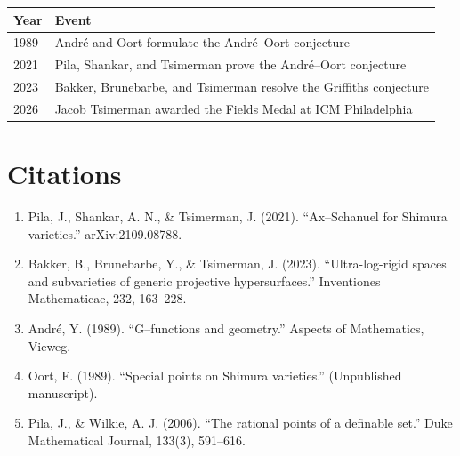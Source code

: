 \begin{tabularx}{\linewidth}{lX}
\toprule
\textbf{Year} & \textbf{Event} \\ \midrule
1989 & André and Oort formulate the André--Oort conjecture \\
2021 & Pila, Shankar, and Tsimerman prove the André--Oort conjecture \\
2023 & Bakker, Brunebarbe, and Tsimerman resolve the Griffiths conjecture \\
2026 & Jacob Tsimerman awarded the Fields Medal at ICM Philadelphia \\
\bottomrule
\end{tabularx}

\section{Citations}

\begin{enumerate}
\item Pila, J., Shankar, A. N., \& Tsimerman, J. (2021). ``Ax--Schanuel for Shimura varieties.'' arXiv:2109.08788.
\item Bakker, B., Brunebarbe, Y., \& Tsimerman, J. (2023). ``Ultra-log-rigid spaces and subvarieties of generic projective hypersurfaces.'' Inventiones Mathematicae, 232, 163--228.
\item André, Y. (1989). ``G--functions and geometry.'' Aspects of Mathematics, Vieweg.
\item Oort, F. (1989). ``Special points on Shimura varieties.'' (Unpublished manuscript).
\item Pila, J., \& Wilkie, A. J. (2006). ``The rational points of a definable set.'' Duke Mathematical Journal, 133(3), 591--616.
\end{enumerate}
